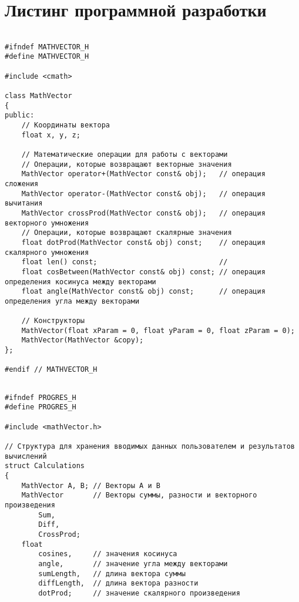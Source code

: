 \begin{landscape}

\pagestyle{fancy}
\renewcommand{\headrulewidth}{0pt}
\setlength{\headheight}{17pt}
\fancyhf{}

\label{sec:listing}
\section{Листинг программной разработки}


\captionsetup[lstlisting]{labelformat=empty}


\begin{lstlisting}[caption={mathVector.h}]

#ifndef MATHVECTOR_H
#define MATHVECTOR_H

#include <cmath>

class MathVector
{
public:
    // Координаты вектора
    float x, y, z;

    // Математические операции для работы с векторами
    // Операции, которые возвращают векторные значения
    MathVector operator+(MathVector const& obj);   // операция сложения
    MathVector operator-(MathVector const& obj);   // операция вычитания
    MathVector crossProd(MathVector const& obj);   // операция векторного умножения
    // Операции, которые возвращают скалярные значения
    float dotProd(MathVector const& obj) const;    // операция скалярного умножения
    float len() const;                             //
    float cosBetween(MathVector const& obj) const; // операция определения косинуса между векторами
    float angle(MathVector const& obj) const;      // операция определения угла между векторами

    // Конструкторы
    MathVector(float xParam = 0, float yParam = 0, float zParam = 0);
    MathVector(MathVector &copy);
};

#endif // MATHVECTOR_H

\end{lstlisting}

\newpage
\begin{lstlisting}[caption={progRes.h}]

#ifndef PROGRES_H
#define PROGRES_H

#include <mathVector.h>

// Структура для хранения вводимых данных пользователем и результатов вычислений
struct Calculations
{
    MathVector A, B; // Векторы A и B
    MathVector       // Векторы суммы, разности и векторного произведения
        Sum,
        Diff,
        CrossProd;
    float
        cosines,     // значения косинуса
        angle,       // значение угла между векторами
        sumLength,   // длина вектора суммы
        diffLength,  // длина вектора разности
        dotProd;     // значение скалярного произведения


\end{lstlisting}
\end{landscape}
